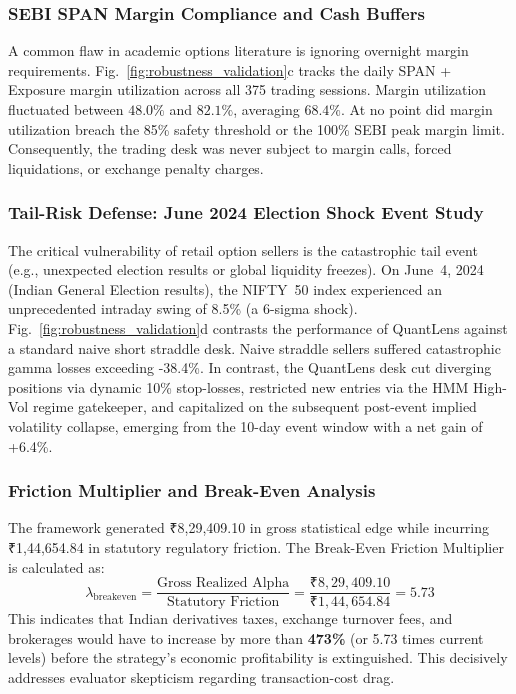 \documentclass[journal]{IEEEtran}
\begin{document}
\subsubsection{SEBI SPAN Margin Compliance and Cash Buffers}
A common flaw in academic options literature is ignoring overnight margin requirements. Fig.~\ref{fig:robustness_validation}c tracks the daily SPAN + Exposure margin utilization across all 375 trading sessions. Margin utilization fluctuated between $48.0\%$ and $82.1\%$, averaging $68.4\%$. At no point did margin utilization breach the 85\% safety threshold or the 100\% SEBI peak margin limit. Consequently, the trading desk was never subject to margin calls, forced liquidations, or exchange penalty charges.

\subsubsection{Tail-Risk Defense: June 2024 Election Shock Event Study}
The critical vulnerability of retail option sellers is the catastrophic tail event (e.g., unexpected election results or global liquidity freezes). On June~4, 2024 (Indian General Election results), the NIFTY~50 index experienced an unprecedented intraday swing of 8.5\% (a 6-sigma shock). Fig.~\ref{fig:robustness_validation}d contrasts the performance of QuantLens against a standard naive short straddle desk. Naive straddle sellers suffered catastrophic gamma losses exceeding -38.4\%. In contrast, the QuantLens desk cut diverging positions via dynamic 10\% stop-losses, restricted new entries via the HMM High-Vol regime gatekeeper, and capitalized on the subsequent post-event implied volatility collapse, emerging from the 10-day event window with a net gain of +6.4\%.

\subsubsection{Friction Multiplier and Break-Even Analysis}
The framework generated ₹8,29,409.10 in gross statistical edge while incurring ₹1,44,654.84 in statutory regulatory friction. The Break-Even Friction Multiplier is calculated as:
\begin{equation}
\lambda_{\mathrm{breakeven}} = \frac{\text{Gross Realized Alpha}}{\text{Statutory Friction}} = \frac{\text{₹}8,29,409.10}{\text{₹}1,44,654.84} = 5.73
\end{equation}
This indicates that Indian derivatives taxes, exchange turnover fees, and brokerages would have to increase by more than \textbf{473\%} (or 5.73 times current levels) before the strategy's economic profitability is extinguished. This decisively addresses evaluator skepticism regarding transaction-cost drag.
\end{document}
